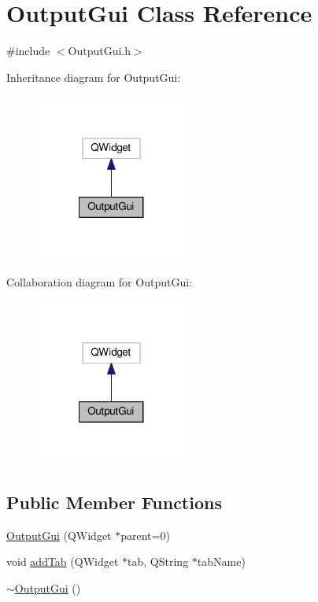 \hypertarget{class_output_gui}{\section{Output\-Gui Class Reference}
\label{class_output_gui}
}


{\ttfamily \#include $<$Output\-Gui.\-h$>$}



Inheritance diagram for Output\-Gui\-:\nopagebreak
\begin{figure}[H]
\begin{center}
\leavevmode
\includegraphics[width=140pt]{class_output_gui__inherit__graph}
\end{center}
\end{figure}


Collaboration diagram for Output\-Gui\-:\nopagebreak
\begin{figure}[H]
\begin{center}
\leavevmode
\includegraphics[width=140pt]{class_output_gui__coll__graph}
\end{center}
\end{figure}
\subsection*{Public Member Functions}
\begin{DoxyCompactItemize}
\item 
\hyperlink{class_output_gui_a6442997196cceca74c0a79ddb9763d2c}{Output\-Gui} (Q\-Widget $\ast$parent=0)
\item 
void \hyperlink{class_output_gui_ad28c34939968c81bdba5e7edcd94fde2}{add\-Tab} (Q\-Widget $\ast$tab, Q\-String $\ast$tab\-Name)
\item 
\hyperlink{class_output_gui_a5b18318b0cf8ebb4118ce9197f80ea49}{$\sim$\-Output\-Gui} ()
\end{DoxyCompactItemize}
